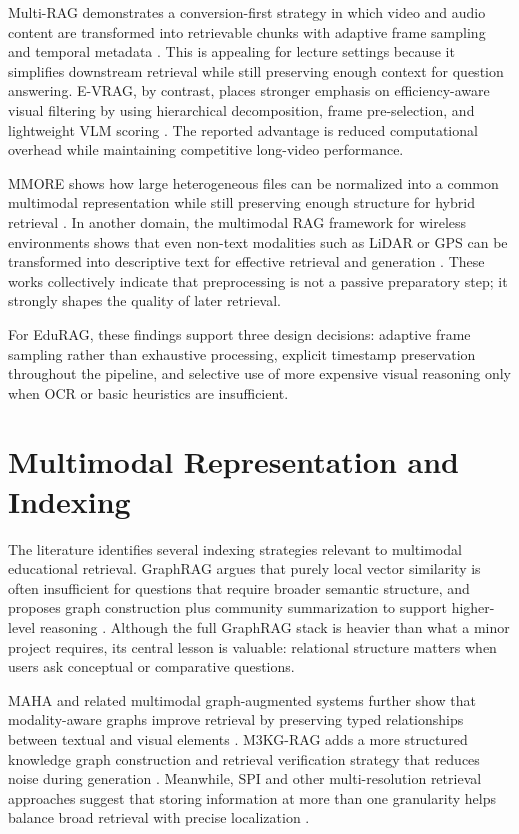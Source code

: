 \documentclass[12pt,a4paper,oneside]{report}
\begin{document}
Multi-RAG demonstrates a conversion-first strategy in which video and audio content are transformed into retrievable chunks with adaptive frame sampling and temporal metadata \cite{mao2024multi}. This is appealing for lecture settings because it simplifies downstream retrieval while still preserving enough context for question answering. E-VRAG, by contrast, places stronger emphasis on efficiency-aware visual filtering by using hierarchical decomposition, frame pre-selection, and lightweight VLM scoring \cite{xu2024evrag}. The reported advantage is reduced computational overhead while maintaining competitive long-video performance.

MMORE shows how large heterogeneous files can be normalized into a common multimodal representation while still preserving enough structure for hybrid retrieval \cite{sallinen2024mmore}. In another domain, the multimodal RAG framework for wireless environments shows that even non-text modalities such as LiDAR or GPS can be transformed into descriptive text for effective retrieval and generation \cite{mohsin2024retrieval}. These works collectively indicate that preprocessing is not a passive preparatory step; it strongly shapes the quality of later retrieval.

For EduRAG, these findings support three design decisions: adaptive frame sampling rather than exhaustive processing, explicit timestamp preservation throughout the pipeline, and selective use of more expensive visual reasoning only when OCR or basic heuristics are insufficient.

\section{Multimodal Representation and Indexing}
The literature identifies several indexing strategies relevant to multimodal educational retrieval. GraphRAG argues that purely local vector similarity is often insufficient for questions that require broader semantic structure, and proposes graph construction plus community summarization to support higher-level reasoning \cite{edge2024local}. Although the full GraphRAG stack is heavier than what a minor project requires, its central lesson is valuable: relational structure matters when users ask conceptual or comparative questions.

MAHA and related multimodal graph-augmented systems further show that modality-aware graphs improve retrieval by preserving typed relationships between textual and visual elements \cite{rashmi2024multimodal}. M3KG-RAG adds a more structured knowledge graph construction and retrieval verification strategy that reduces noise during generation \cite{park2024m3kg}. Meanwhile, SPI and other multi-resolution retrieval approaches suggest that storing information at more than one granularity helps balance broad retrieval with precise localization \cite{liu2024towards}.
\end{document}
